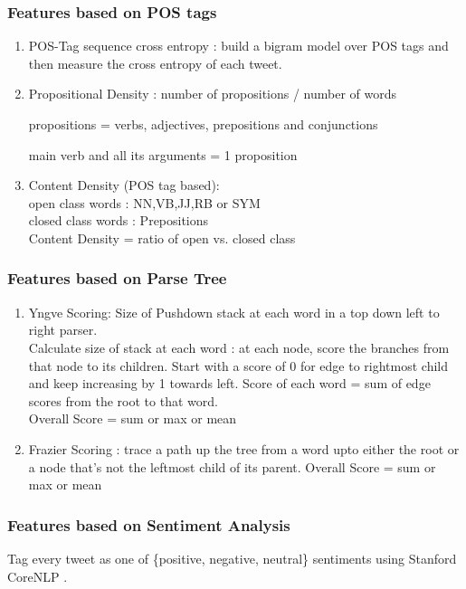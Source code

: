 \documentclass[10pt]{article}
\begin{document}
\subsubsection{Features based on POS tags}
\begin{enumerate}
\item  POS-Tag sequence cross entropy : 
build a bigram model over POS tags and then measure the cross entropy of each tweet.
\item Propositional Density : 
number of propositions / number of words

propositions = verbs, adjectives,  prepositions and conjunctions

main verb and all its arguments = 1 proposition

\item Content Density (POS tag based): \\
open class words : NN,VB,JJ,RB or SYM \\
closed class words : Prepositions \\
Content Density = ratio of open vs. closed class 
\end{enumerate}


\subsubsection{Features based on Parse Tree}
\begin{enumerate}
\item Yngve Scoring: Size of Pushdown stack at each word in a top down left to right parser.\\
Calculate size of stack at each word : at each node, score the branches from that node to its children. Start with a score of 0 for edge to rightmost child and keep increasing by 1 towards left.
Score of each word = sum of edge scores from the root to that
 word.\\
 Overall Score = sum or max or mean 
\item Frazier Scoring : trace a path up the tree from a word upto either the root or a node that's not the leftmost child of its parent.
 Overall Score = sum or max or mean 
\end{enumerate}

\subsubsection{Features based on Sentiment Analysis}
 Tag every tweet as one of \{positive, negative, neutral\} sentiments using Stanford CoreNLP \cite{stanfordCoreNLP}.
\end{document}
